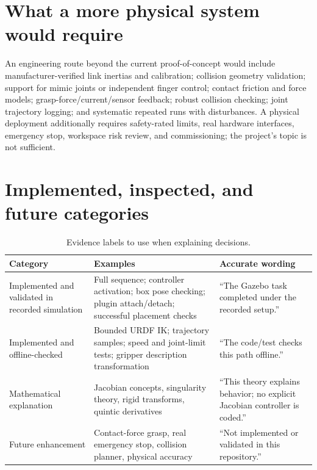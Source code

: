 \section{What a more physical system would require}
An engineering route beyond the current proof-of-concept would include
manufacturer-verified link inertias and calibration; collision geometry
validation; support for mimic joints or independent finger control; contact
friction and force models; grasp-force/current/sensor feedback; robust
collision checking; joint trajectory logging; and systematic repeated runs
with disturbances. A physical deployment additionally requires safety-rated
limits, real hardware interfaces, emergency stop, workspace risk review, and
commissioning; the project's  topic is not sufficient.

\section{Implemented, inspected, and future categories}
\begin{table}[htbp]
\centering\small
\caption{Evidence labels to use when explaining decisions.}\label{tab:evidence-levels}
\begin{tabularx}{\textwidth}{p{}X X}
\toprule Category & Examples & Accurate wording\\\midrule
Implemented and validated in recorded simulation & Full sequence; controller activation; box pose checking; plugin attach/detach; successful placement checks & ``The Gazebo task completed under the recorded setup.''\\
Implemented and offline-checked & Bounded URDF IK; trajectory samples; speed and joint-limit tests; gripper description transformation & ``The code/test checks this path offline.''\\
Mathematical explanation & Jacobian concepts, singularity theory, rigid transforms, quintic derivatives & ``This theory explains behavior; no explicit Jacobian controller is coded.''\\
Future enhancement & Contact-force grasp, real emergency stop, collision planner, physical accuracy & ``Not implemented or validated in this repository.''\\
\bottomrule
\end{tabularx}
\end{table}
